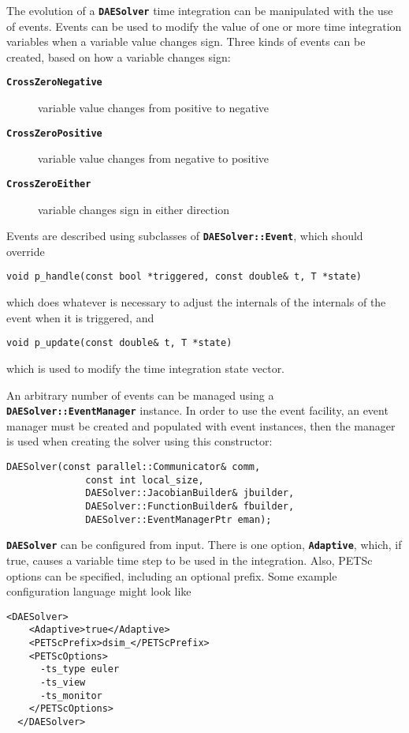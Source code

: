 The evolution of a \texttt{\textbf{DAESolver}} time integration can be
manipulated with the use of events.  Events can be used to modify the
value of one or more time integration variables when a variable value
changes sign.  Three kinds of events can be created, based on how a
variable changes sign:
\begin{description}
\item[\texttt{\textbf{CrossZeroNegative}}]
  variable value changes from positive to negative
\item[\texttt{\textbf{CrossZeroPositive}}]
  variable value changes from negative to positive
\item[\texttt{\textbf{CrossZeroEither}}]
  variable changes sign in either direction
\end{description}
Events are described using subclasses of
\texttt{\textbf{DAESolver::Event}}, which should override
{ \color{red}
\begin{Verbatim}[fontseries=b]
   void p_handle(const bool *triggered, const double& t, T *state)
\end{Verbatim}
}
which does whatever is necessary to adjust the internals of the
internals of the event when it is triggered, and
{ \color{red}
\begin{Verbatim}[fontseries=b]
   void p_update(const double& t, T *state)
\end{Verbatim}
}
which is used to modify the time integration state vector.

An arbitrary number of events
can be managed using a \texttt{\textbf{DAESolver::EventManager}}
instance.  In order to use the event facility, an event manager must
be created and populated with event instances, then the manager is
used when creating the solver using this constructor:

{ \color{red}
\begin{Verbatim}[fontseries=b]
    DAESolver(const parallel::Communicator& comm, 
              const int local_size,
              DAESolver::JacobianBuilder& jbuilder,
              DAESolver::FunctionBuilder& fbuilder,
              DAESolver::EventManagerPtr eman);
\end{Verbatim}
}

\textbf{\texttt{DAESolver}} can be configured from input.  There is
one option, \texttt{\textbf{Adaptive}}, which, if true, causes a
variable time step to be used in the integration.  Also, PETSc options
can be specified, including an optional prefix.  Some example configuration
language might look like

{ \color{blue}
\begin{Verbatim}[fontseries=b]
  <DAESolver>
    <Adaptive>true</Adaptive>
    <PETScPrefix>dsim_</PETScPrefix>
    <PETScOptions>
      -ts_type euler
      -ts_view
      -ts_monitor
    </PETScOptions>
  </DAESolver>
\end{Verbatim}
}


